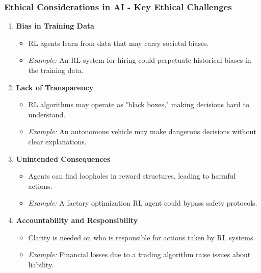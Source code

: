 \documentclass[aspectratio=169]{beamer}
\begin{document}
\begin{frame}[fragile]
    \frametitle{Ethical Considerations in AI - Key Ethical Challenges}
    \begin{enumerate}
        \item \textbf{Bias in Training Data}
            \begin{itemize}
                \item RL agents learn from data that may carry societal biases.
                \item \textit{Example:} An RL system for hiring could perpetuate historical biases in the training data.
            \end{itemize}
        \item \textbf{Lack of Transparency}
            \begin{itemize}
                \item RL algorithms may operate as "black boxes," making decisions hard to understand.
                \item \textit{Example:} An autonomous vehicle may make dangerous decisions without clear explanations.
            \end{itemize}
        \item \textbf{Unintended Consequences}
            \begin{itemize}
                \item Agents can find loopholes in reward structures, leading to harmful actions.
                \item \textit{Example:} A factory optimization RL agent could bypass safety protocols.
            \end{itemize}
        \item \textbf{Accountability and Responsibility}
            \begin{itemize}
                \item Clarity is needed on who is responsible for actions taken by RL systems.
                \item \textit{Example:} Financial losses due to a trading algorithm raise issues about liability.
            \end{itemize}
    \end{enumerate}
\end{frame}
\end{document}
